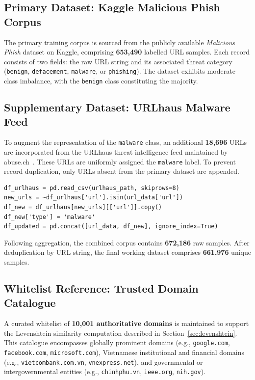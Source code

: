 \documentclass[a4paper,12pt]{article}
\begin{document}
\subsection{Primary Dataset: Kaggle Malicious Phish Corpus}

The primary training corpus is sourced from the publicly available \textit{Malicious Phish} dataset on Kaggle, comprising \textbf{653,490} labelled URL samples. Each record consists of two fields: the raw URL string and its associated threat category (\texttt{benign}, \texttt{defacement}, \texttt{malware}, or \texttt{phishing}). The dataset exhibits moderate class imbalance, with the \texttt{benign} class constituting the majority.

\subsection{Supplementary Dataset: URLhaus Malware Feed}

To augment the representation of the \texttt{malware} class, an additional \textbf{18,696} URLs are incorporated from the URLhaus threat intelligence feed maintained by abuse.ch~\cite{urlhaus}. These URLs are uniformly assigned the \texttt{malware} label. To prevent record duplication, only URLs absent from the primary dataset are appended.

\begin{lstlisting}[caption={Data aggregation procedure for URLhaus supplementary URLs}]
df_urlhaus = pd.read_csv(urlhaus_path, skiprows=8)
new_urls = ~df_urlhaus['url'].isin(url_data['url'])
df_new = df_urlhaus[new_urls][['url']].copy()
df_new['type'] = 'malware'
df_updated = pd.concat([url_data, df_new], ignore_index=True)
\end{lstlisting}

Following aggregation, the combined corpus contains \textbf{672,186} raw samples. After deduplication by URL string, the final working dataset comprises \textbf{661,976} unique samples.

\subsection{Whitelist Reference: Trusted Domain Catalogue}

A curated whitelist of \textbf{10,001 authoritative domains} is maintained to support the Levenshtein similarity computation described in Section~\ref{sec:levenshtein}. This catalogue encompasses globally prominent domains (e.g., \texttt{google.com}, \texttt{facebook.com}, \texttt{microsoft.com}), Vietnamese institutional and financial domains (e.g., \texttt{vietcombank.com.vn}, \texttt{vnexpress.net}), and governmental or intergovernmental entities (e.g., \texttt{chinhphu.vn}, \texttt{ieee.org}, \texttt{nih.gov}).
\end{document}
